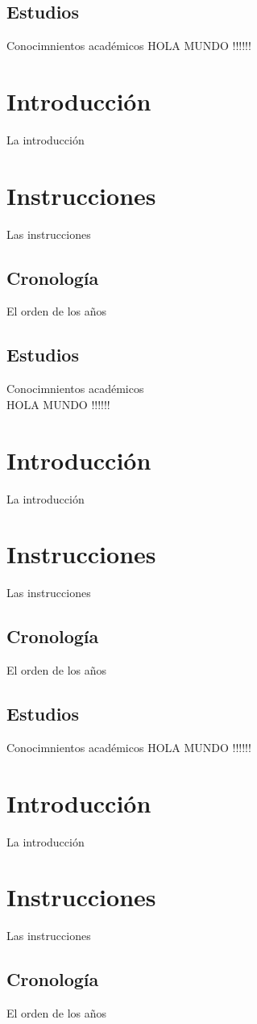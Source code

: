 \documentclass[30pt,a4paper]{article}
\begin{document}
    \subsection{Estudios}
      Conocimnientos académicos  HOLA MUNDO !!!!!! 
  \section{Introducción}
    La introducción
  \section{Instrucciones}
    Las instrucciones
    \subsection{Cronología}
      El orden de los años
    \subsection{Estudios}
      Conocimnientos académicos\\
        HOLA MUNDO !!!!!! 
  \section{Introducción}
    La introducción
  \section{Instrucciones}
    Las instrucciones
    \subsection{Cronología}
      El orden de los años
    \subsection{Estudios}
      Conocimnientos académicos  HOLA MUNDO !!!!!! 
  \section{Introducción}
    La introducción
  \section{Instrucciones}
    Las instrucciones
    \subsection{Cronología}
      El orden de los años
\end{document}
